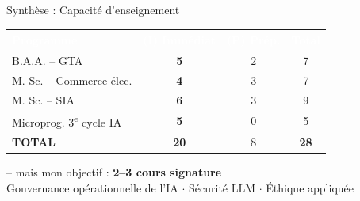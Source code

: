 \documentclass[aspectratio=169,11pt]{beamer}
\begin{document}
\begin{frame}{Synthèse : Capacité d'enseignement}
  \begin{center}
    \renewcommand{\arraystretch}{1.3}
    \begin{tabular}{l|c|c|c}
      \rowcolor{ushervert}
      \textcolor{white}{\textbf{Programme}} & \textcolor{white}{\textbf{(I) Immédiat}} & \textcolor{white}{\textbf{(P) Prép.}} & \textcolor{white}{\textbf{Total}} \\
      \hline
      \rowcolor{ushervertclair}
      B.A.A. -- GTA & \textcolor{immediatgreen}{\textbf{5}} & \textcolor{prepareorange}{2} & 7 \\
      \hline
      M. Sc. -- Commerce élec. & \textcolor{immediatgreen}{\textbf{4}} & \textcolor{prepareorange}{3} & 7 \\
      \hline
      \rowcolor{ushervertclair}
      M. Sc. -- SIA & \textcolor{immediatgreen}{\textbf{6}} & \textcolor{prepareorange}{3} & 9 \\
      \hline
      Microprog. 3\textsuperscript{e} cycle IA & \textcolor{immediatgreen}{\textbf{5}} & \textcolor{prepareorange}{0} & 5 \\
      \hline
      \rowcolor{usheror!20}
      \textbf{TOTAL} & \textcolor{immediatgreen}{\textbf{20}} & \textcolor{prepareorange}{8} & \textbf{28} \\
    \end{tabular}
  \end{center}
  
  \vspace{0.3em}
  
  \begin{center}
     -- mais mon objectif : \textbf{2--3 cours signature}\\[0.3em]
    {\small Gouvernance opérationnelle de l'IA $\cdot$ Sécurité LLM $\cdot$ Éthique appliquée}
  \end{center}
\end{frame}
\end{document}
